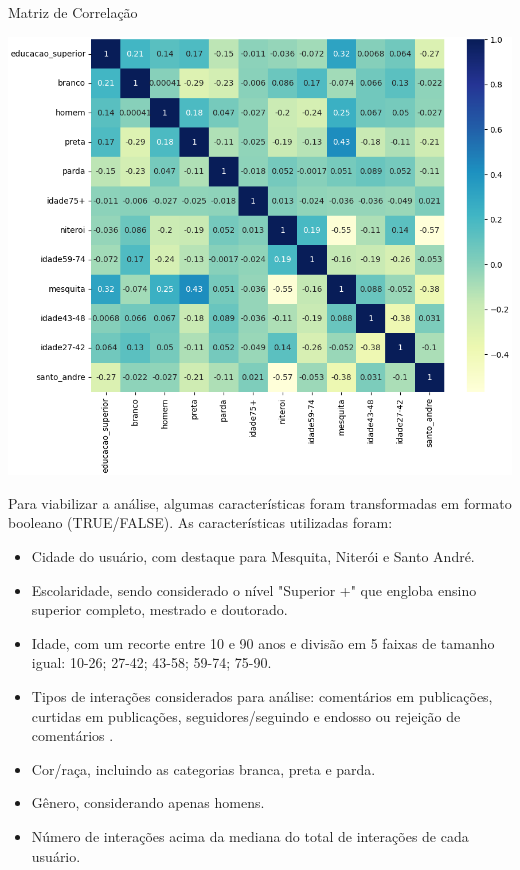 \begin{quadro}[!htb]
	\caption{Matriz de Correlação}
	\label{fig:colab_correlation_matrix}
	\centering
	\includegraphics[scale=0.6]{images/colab_correlation_matrix.png}
\end{quadro}

Para viabilizar a análise, algumas características foram transformadas em formato booleano (TRUE/FALSE). As características utilizadas foram:

\begin{itemize}
	\item Cidade do usuário, com destaque para Mesquita, Niterói e Santo André.
	\item Escolaridade, sendo considerado o nível "Superior +" que engloba ensino superior completo, mestrado e doutorado.
	\item Idade, com um recorte entre 10 e 90 anos e divisão em 5 faixas de tamanho igual: 10-26; 27-42; 43-58; 59-74; 75-90.
	\item Tipos de interações considerados para análise: comentários em publicações, curtidas em publicações, seguidores/seguindo e endosso ou rejeição de comentários .
	\item Cor/raça, incluindo as categorias branca, preta e parda.
	\item Gênero, considerando apenas homens.
	\item Número de interações acima da mediana do total de interações de cada usuário.
\end{itemize}

